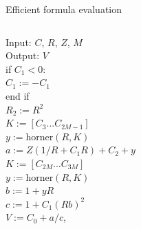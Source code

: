 \documentclass{beamer}
\newenvironment{ppl}{\fontfamily{ppl}\selectfont}{\par}
\def\spc{\hspace*{0.5cm}} 			%
\begin{document}
\begin{frame}{Efficient formula evaluation}
\begin{columns}[c]
\begin{column}{0.5\textwidth}
\begin{ppl}
                Input: $C$, $R$, $Z$, $M$\\
                Output: $V$ \\
                if $C_1 < 0$: \\
                \spc $C_1 := -C_1$ \\
                end if \\
                $R_2 := R^2$ \\
                $K := [C_3 ... C_{2M-1}]$\\
                $y := \text{horner}(R, K)$\\
                $a := Z(1/R + C_1R) + C_2 + y$\\
                $K := [C_{2M} ... C_{3M}]$\\
                $y := \text{horner}(R, K)$\\
                $b := 1 + yR$\\
                $c := 1 + C_1(Rb)^2$\\
                $V := C_0 + a/c$, \\
            \end{ppl}
        \end{column}
    \end{columns}
\end{frame}

\end{document}
